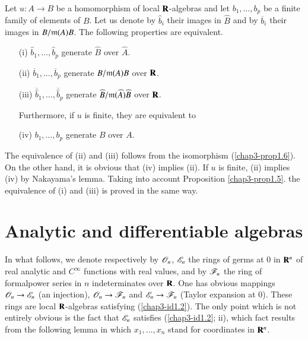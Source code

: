 \begin{corollary}\label{chap3-coro1.8}
Let $u:A\to B$ be a homomorphism of local $\mathbf{R}$-algebras and let $b_{1},\ldots,b_{p}$ be a finite family of elements of $B$. Let us denote by $\widehat{b}_{i}$ their images in $\widehat{B}$ and by $\overline{b}_{i}$ their images in $B/\mathfrak{m}(A)B$. The following properties are equivalent.
\begin{itemize}
\item[\rm(i)] $\widehat{b}_{1},\ldots,\widehat{b}_{p}$ generate $\widehat{B}$ over $\widehat{A}$.

\item[\rm(ii)] $\overline{b}_{1},\ldots,\overline{b}_{p}$ generate $B/\mathfrak{m}(A)B$ over $\mathbf{R}$.

\item[\rm(iii)] $\overline{\widehat{b}}_{1},\ldots,\overline{\widehat{b}}_{p}$ generate $\widehat{B}/\mathfrak{m}(\widehat{A})\widehat{B}$ over $\mathbf{R}$.

Furthermore, if $u$ is finite, they are equivalent to

\item[\rm(iv)] $b_{1},\ldots,b_{p}$ generate $B$ over $A$.
\end{itemize}
\end{corollary}

The equivalence of (ii) and (iii) follows from the isomorphism (\ref{chap3-prop1.6}). On the other hand, it is obvious that (iv) implies (ii). If $u$ is finite, (ii) implies (iv) by Nakayama's lemma. Taking into account Proposition \ref{chap3-prop1.5}. the equivalence of (i) and (iii) is proved in the same way.

\section{Analytic and differentiable algebras}\label{chap3-sec2}

In what follows, we denote respectively by $\mathscr{O}_{n}$, $\mathscr{E}_{n}$ the rings of germs at $0$ in $\mathbf{R}^{n}$ of real analytic and $C^{\infty}$ functions with real values, and by $\mathscr{F}_{n}$ the ring of formal\pageoriginale power series in $n$ indeterminates over $\mathbf{R}$. One has obvious mappings $\mathscr{O}_{n}\to \mathscr{E}_{n}$ (an injection), $\mathscr{O}_{n}\to \mathscr{F}_{n}$ and $\mathscr{E}_{n}\to \mathscr{F}_{n}$ (Taylor expansion at $0$). These rings are local $\mathbf{R}$-algebras satisfying (\ref{chap3-id1.2}). The only point which is not entirely obvious is the fact that $\mathscr{E}_{n}$ satisfies (\ref{chap3-id1.2}; ii), which fact results from the following lemma in which $x_{1},\ldots,x_{n}$ stand for coordinates in $\mathbf{R}^{n}$.

